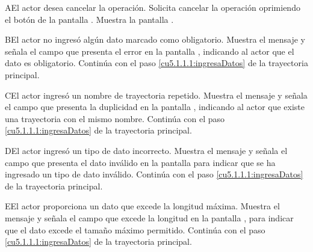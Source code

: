  \begin{UCtrayectoriaA}{A}{El actor desea cancelar la operación.}
    \UCpaso[\UCactor] Solicita cancelar la operación oprimiendo el botón  de la pantalla .
    \UCpaso[\UCsist] Muestra la pantalla .
 \end{UCtrayectoriaA}
 
 \begin{UCtrayectoriaA}{B}{El actor no ingresó algún dato marcado como obligatorio.}
    \UCpaso[\UCsist] Muestra el mensaje  y señala el campo que presenta el error en la pantalla 
	    , indicando al actor que el dato es obligatorio.
    \UCpaso[] Continúa con el paso \ref{cu5.1.1.1:ingresaDatos} de la trayectoria principal.
 \end{UCtrayectoriaA}
 \begin{UCtrayectoriaA}{C}{El actor ingresó un nombre de trayectoria repetido.}
    \UCpaso[\UCsist] Muestra el mensaje  y señala el campo que presenta la duplicidad en la pantalla 
	    , indicando al actor que existe una trayectoria con el mismo nombre.
    \UCpaso[] Continúa con el paso \ref{cu5.1.1.1:ingresaDatos} de la trayectoria principal.
 \end{UCtrayectoriaA}
 \begin{UCtrayectoriaA}{D}{El actor ingresó un tipo de dato incorrecto.}
    \UCpaso[\UCsist] Muestra el mensaje  y señala el campo que presenta el dato inválido en la 
    pantalla  para indicar que se ha ingresado un tipo de dato inválido.
    \UCpaso[] Continúa con el paso \ref{cu5.1.1.1:ingresaDatos} de la trayectoria principal.
 \end{UCtrayectoriaA}
 \begin{UCtrayectoriaA}{E}{El actor proporciona un dato que excede la longitud máxima.}
    \UCpaso[\UCsist] Muestra el mensaje  y señala el campo que excede la 
    longitud en la pantalla , para indicar que el dato excede el tamaño máximo permitido.
    \UCpaso[] Continúa con el paso \ref{cu5.1.1.1:ingresaDatos} de la trayectoria principal.
 \end{UCtrayectoriaA}


